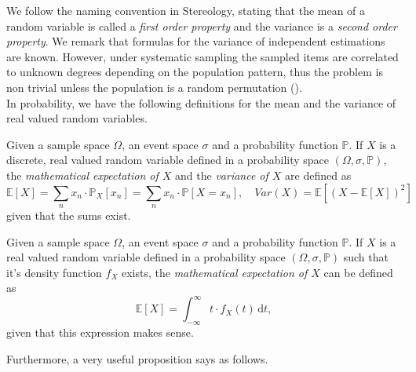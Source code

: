 We follow the naming convention in Stereology, stating that the mean of a random variable is called a \textit{first order property} and the variance is a \textit{second order property}. We remark that formulas for the variance of %
independent estimations are known. However, under systematic sampling the sampled items are correlated to unknown degrees depending on the population pattern, thus the problem is non trivial unless the
population is a random permutation (\cite{CO.IAS.17.Hist.pdf}).\\

In probability, we have the following definitions for the mean and the variance of real valued random variables.\\

\begin{Def}
    Given a sample space $\Omega$, an event space $\sigma$ and a probability function $\mathbb{P}$. If $X$ is a discrete, real valued random variable defined in a probability space $(\Omega, \sigma, \mathbb{P})$, the \textit{mathematical expectation of $X$} and the \textit{variance of $X$} are defined as
    \begin{equation*}
        \mathbb{E}[X]=\sum_n x_n \cdot \mathbb{P}_X[x_n] = \sum_n x_n \cdot \mathbb{P}[X=x_n], \quad Var(X)=\mathbb{E}[(X-\mathbb{E}[X])^2]
    \end{equation*}
    given that the sums exist.
\end{Def}
\vspace{2mm}
\begin{Def}
    Given a sample space $\Omega$, an event space $\sigma$ and a probability function $\mathbb{P}$. If $X$ is a real valued random variable defined in a probability space $(\Omega, \sigma, \mathbb{P})$ such that it's density function $f_X$ exists, the \textit{mathematical expectation of $X$} can be defined as
    \begin{equation*}
        \mathbb{E}[X]=\int_{-\infty}^{\infty} t \cdot f_X(t)\,\mathrm{d}t,
    \end{equation*}
    given that this expression makes sense.
\end{Def}

\vspace{2mm}
Furthermore, a very useful proposition says as follows.\\

